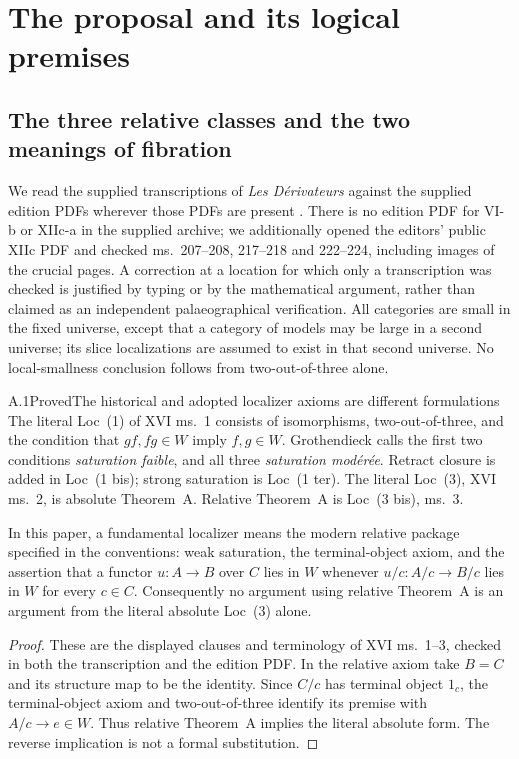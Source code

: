 \section{The proposal and its logical premises}

\subsection{The three relative classes and the two meanings of fibration}

We read the supplied transcriptions of \emph{Les D\'erivateurs} against the supplied edition PDFs wherever those PDFs are present \citep{BISITEGrothendieck1991}. There is no edition PDF for VI-b or XIIc-a in the supplied archive; we additionally opened the editors' public XIIc PDF and checked ms.~207--208, 217--218 and 222--224, including images of the crucial pages. A correction at a location for which only a transcription was checked is justified by typing or by the mathematical argument, rather than claimed as an independent palaeographical verification. All categories are small in the fixed universe, except that a category of models may be large in a second universe; its slice localizations are assumed to exist in that second universe. No local-smallness conclusion follows from two-out-of-three alone.

\begin{claim}{A.1}{Proved}{The historical and adopted localizer axioms are different formulations}
The literal Loc~(1) of XVI ms.~1 consists of isomorphisms, two-out-of-three, and the condition that $gf,fg\in W$ imply $f,g\in W$. Grothendieck calls the first two conditions \emph{saturation faible}, and all three \emph{saturation mod\'er\'ee}. Retract closure is added in Loc~(1 bis); strong saturation is Loc~(1 ter). The literal Loc~(3), XVI ms.~2, is absolute Theorem~A. Relative Theorem~A is Loc~(3 bis), ms.~3.

In this paper, a fundamental localizer means the modern relative package specified in the conventions: weak saturation, the terminal-object axiom, and the assertion that a functor $u:A\to B$ over $C$ lies in $W$ whenever $u/c:A/c\to B/c$ lies in $W$ for every $c\in C$. Consequently no argument using relative Theorem~A is an argument from the literal absolute Loc~(3) alone.
\end{claim}
\begin{proof}
These are the displayed clauses and terminology of XVI ms.~1--3, checked in both the transcription and the edition PDF. In the relative axiom take $B=C$ and its structure map to be the identity. Since $C/c$ has terminal object $1_c$, the terminal-object axiom and two-out-of-three identify its premise with $A/c\to e\in W$. Thus relative Theorem~A implies the literal absolute form. The reverse implication is not a formal substitution.
\end{proof}

